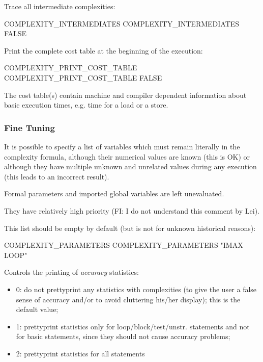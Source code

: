 \documentclass[a4paper]{report}
\begin{document}
Trace all intermediate complexities:

\begin{PipsProp}{COMPLEXITY_INTERMEDIATES}
COMPLEXITY_INTERMEDIATES FALSE
\end{PipsProp}

Print the complete cost table at the beginning of the execution:

\begin{PipsProp}{COMPLEXITY_PRINT_COST_TABLE}
COMPLEXITY_PRINT_COST_TABLE FALSE
\end{PipsProp}

The cost table(s) contain machine and compiler dependent information
about basic execution times, e.g. time for a load or a store.

\subsubsection{Fine Tuning}

It is possible to specify a list of variables which must remain
literally in the complexity formula, although their numerical values
are known (this is OK) or although they have multiple unknown and
unrelated values during any execution (this leads to an incorrect
result).

Formal parameters and imported global variables are left unevaluated.

They have relatively high priority (FI: I do not understand this comment
by Lei).

This list should be empty by default (but is not for unknown historical
reasons):

\begin{PipsProp}{COMPLEXITY_PARAMETERS}
COMPLEXITY_PARAMETERS "IMAX LOOP"
\end{PipsProp}

Controls the printing of {\em accuracy} statistics:

\begin{itemize}

  \item 0: do not prettyprint any statistics with complexities (to give
the user a false sense of accuracy and/or to avoid cluttering his/her
display); this is the default value;

  \item 1: prettyprint statistics only for loop/block/test/unstr.
statements and not for basic statements, since they should not cause
accuracy problems;

  \item 2: prettyprint statistics for all statements

\end{itemize}
\end{document}
